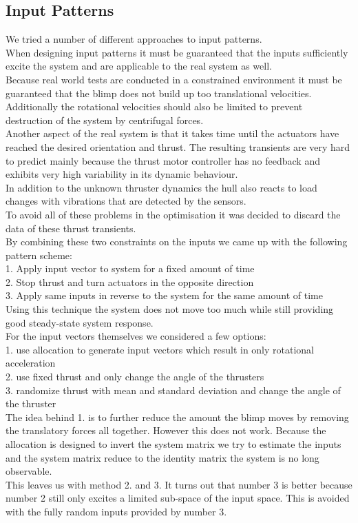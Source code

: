 \subsection{Input Patterns}
\label{sub:input_pattern}
We tried a number of different approaches to input patterns. \\
When designing input patterns it must be guaranteed that the inputs sufficiently excite the system and are applicable to the real system as well.\\
Because real world tests are conducted in a constrained environment it must be guaranteed that the blimp does not build up too translational velocities.
Additionally the rotational velocities should also be limited to prevent destruction of the system by centrifugal forces. \\
Another aspect of the real system is that it takes time until the actuators have reached the desired orientation and thrust.
The resulting transients are very hard to predict mainly because the thrust motor controller has no feedback and exhibits very high variability in its dynamic behaviour. \\
In addition to the unknown thruster dynamics the hull also reacts to load changes with vibrations that are detected by the sensors. \\
To avoid all of these problems in the optimisation it was decided to discard the data of these thrust transients. \\
By combining these two constraints on the inputs we came up with the following pattern scheme: \\
1. Apply input vector to system for a fixed amount of time\\
2. Stop thrust and turn actuators in the opposite direction\\
3. Apply same inputs in reverse to the system for the same amount of time\\
Using this technique the system does not move too much while still providing good steady-state system response. \\
For the input vectors themselves we considered a few options:\\
1. use allocation to generate input vectors which result in only rotational acceleration\\
2. use fixed thrust and only change the angle of the thrusters\\
3. randomize thrust with mean and standard deviation and change the angle of the thruster\\
The idea behind 1. is to further reduce the amount the blimp moves by removing the translatory forces all together. 
However this does not work. Because the allocation is designed to invert the system matrix we try to estimate the inputs and the system matrix reduce to the identity matrix the system is no long observable.\\
This leaves us with method 2. and 3.
It turns out that number 3 is better because number 2 still only excites a limited sub-space of the input space. This is avoided with the fully random inputs provided by number 3.\\

